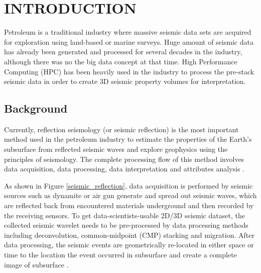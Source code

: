 %
%
%



\pagestyle{plain} %
\setcounter{page}{1}


\chapter{\uppercase {Introduction}}

Petroleum is a traditional industry where massive seismic data sets are acquired for exploration using land-based or marine surveys. Huge amount of seismic data has already been generated and processed for several decades in the industry, although there was no the big data concept at that time. High Performance Computing (HPC) has been heavily used in the industry to process the pre-stack seismic data in order to create 3D seismic property volumes for interpretation. 

\section{Background}
Currently, reflection seismology (or seismic reflection) is the most important method used in the petroleum industry to estimate the properties of the Earth's subsurface from reflected seismic waves and explore geophysics using the principles of seismology. The complete processing flow of this method involves data acquisition, data processing, data interpretation and attributes analysis \cite{seisreflectionwiki}. 

As shown in Figure \ref{seismic_reflection}, data acquisition is performed by seismic sources such as dynamite or air gun generate and spread out seismic waves, which are reflected back from encountered materials underground and then recorded by the receiving sensors. To get data-scientists-usable 2D/3D seismic dataset, the collected seismic wavelet needs to be pre-processed by data processing methods including deconvolution, common-midpoint (CMP) stacking and migration. After data processing, the seismic events are geometrically re-located in either space or time to the location the event occurred in subsurface and create a complete image of subsurface \cite{seisreflectionwiki}. 

